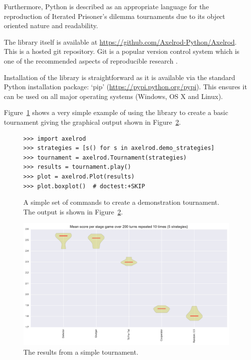 \documentclass{article}
\begin{document}
Furthermore, \cite{Isaac2008} Python is described as an appropriate language for the
reproduction of Iterated Prisoner's dilemma tournaments due to its object
oriented nature and readability.

The library itself is available at
\url{https://github.com/Axelrod-Python/Axelrod}. This is a hosted git
repository. Git is a popular version control system which is one of the
recommended aspects of reproducible research \cite{Crick2014a, Sandve2013}.

Installation of the library is straightforward as it is available via the
standard Python installation package: `pip'
(\url{https://pypi.python.org/pypi}). This ensures it can be used on all major
operating systems (Windows, OS X and Linux).

Figure~\ref{fig:demo_tournament_commands} shows a very simple example of using
the library to create a basic tournament giving the graphical output shown in
Figure~\ref{fig:demo_tournament}.

\begin{figure}[!hbtp]
    \begin{verbatim}
>>> import axelrod
>>> strategies = [s() for s in axelrod.demo_strategies]
>>> tournament = axelrod.Tournament(strategies)
>>> results = tournament.play()
>>> plot = axelrod.Plot(results)
>>> plot.boxplot()  # doctest:+SKIP
    \end{verbatim}
    \caption{A simple set of commands to create a demonstration tournament. The
        output is shown in Figure~\ref{fig:demo_tournament}.}
    \label{fig:demo_tournament_commands}
\end{figure}

\begin{figure}[!hbtp]
    \centering
    \includegraphics[width=.8\textwidth]{../img/demo_tournament.pdf}
    \caption{The results from a simple tournament.}
    \label{fig:demo_tournament}
\end{figure}
\end{document}
